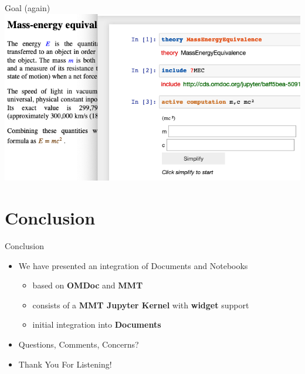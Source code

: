 \documentclass{beamer}
\begin{document}
    \begin{frame}[fragile]{ Goal (again) }
        \includegraphics[scale=0.5]{images/acwidget}
    \end{frame}


    \section{Conclusion}

    \begin{frame}{Conclusion}
        \begin{itemize}
            \item We have presented an integration of Documents and Notebooks
            \begin{itemize}
                \item based on \textbf{OMDoc} and \textbf{MMT}
                \item consists of a \textbf{MMT Jupyter Kernel} with \textbf{widget} support
                \item initial integration into \textbf{Documents}
            \end{itemize}


            \item Questions, Comments, Concerns?

            \item Thank You For Listening!

            \vspace{2em}


        \end{itemize}
    \end{frame}
\end{document}
